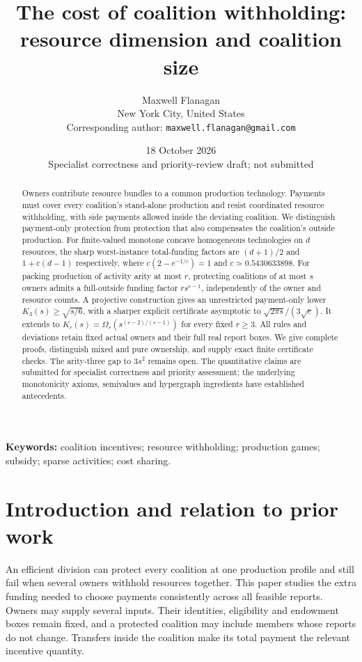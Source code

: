 \documentclass[11pt]{article}
\title{The cost of coalition withholding:\\resource dimension and coalition size}
\author{Maxwell Flanagan\\[2pt]\small New York City, United States\\[2pt]
\small Corresponding author: \texttt{maxwell.flanagan@gmail.com}}
\date{18 October 2026\\\small Specialist correctness and priority-review draft; not submitted}
\theoremstyle{definition}\newtheorem{definition}[theorem]{Definition}
\theoremstyle{remark}\newtheorem{remark}[theorem]{Remark}
\begin{document}
\maketitle
\begin{abstract}
Owners contribute resource bundles to a common production technology. Payments
must cover every coalition's stand-alone production and resist coordinated
resource withholding, with side payments allowed inside the deviating coalition.
We distinguish payment-only protection from protection that also compensates
the coalition's outside production. For finite-valued monotone concave
homogeneous technologies on $d$ resources, the sharp worst-instance total-funding
factors are $(d+1)/2$ and $1+c(d-1)$ respectively, where
$c(2-e^{-1/c})=1$ and $c\simeq0.5430633898$.
For packing production of activity arity at most $r$, protecting coalitions of
at most $s$ owners admits a full-outside funding factor $rs^{r-1}$,
independently of the owner and resource counts.
A projective construction gives an unrestricted payment-only lower
$K_3(s)\ge\sqrt{s/6}$, with a sharper explicit certificate asymptotic to
$\sqrt{2\pi s}/(3\sqrt e)$. It extends to
$K_r(s)=\Omega_r(s^{(r-2)/(r-1)})$ for every fixed $r\ge3$.
All rules and deviations retain fixed actual owners and their full real report
boxes. We give complete proofs, distinguish mixed and pure ownership, and
supply exact finite certificate checks. The arity-three gap to $3s^2$ remains
open. The quantitative claims are submitted for specialist correctness and
priority assessment; the underlying monotonicity axioms, semivalues and
hypergraph ingredients have established antecedents.
\end{abstract}
\smallskip
\noindent\textbf{Keywords:} coalition incentives; resource withholding;
production games; subsidy; sparse activities; cost sharing.
\clearpage
\tableofcontents
\newpage

\section{Introduction and relation to prior work}\label{sec:intro}
An efficient division can protect every coalition at one production profile
and still fail when several owners withhold resources together. This paper
studies the extra funding needed to choose payments consistently across all
feasible reports. Owners may supply several inputs. Their identities,
eligibility and endowment boxes remain fixed, and a protected coalition may
include members whose reports do not change. Transfers inside the coalition
make its total payment the relevant incentive quantity.
\end{document}
